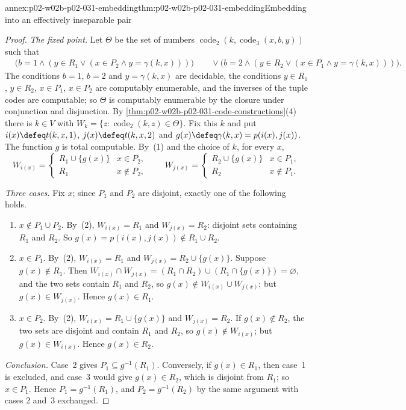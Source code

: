\begin{annexitem}{annex:p02-w02b-p02-031-embedding}{thm:p02-w02b-p02-031-embedding}{Embedding into an effectively inseparable pair}
\begin{proof}
\emph{The fixed point.}  Let \(\Theta\) be the set of numbers
\(\operatorname{code}_2(k,\operatorname{code}_3(x,b,y))\) such that
\[
\begin{aligned}
 &\bigl(b=1\land(y\in R_1\lor(x\in P_2\land y=\gamma(k,x)))\bigr)\
 &\quad\lor
 \bigl(b=2\land(y\in R_2\lor(x\in P_1\land y=\gamma(k,x)))\bigr).
\end{aligned}
\]
The conditions \(b=1\), \(b=2\) and \(y=\gamma(k,x)\) are decidable, the
conditions \(y\in R_1\), \(y\in R_2\), \(x\in P_1\), \(x\in P_2\) are
computably enumerable, and the inverses of the tuple codes are computable; so
\(\Theta\) is computably enumerable by the closure under conjunction and
disjunction.  By \cref{thm:p02-w02b-p02-031-code-constructions}(4) there is
\(k\in V\) with \(W_k=\{z:\operatorname{code}_2(k,z)\in\Theta\}\).  Fix this
\(k\) and put \(i(x)\defeq t(k,x,1)\), \(j(x)\defeq t(k,x,2)\) and
\(g(x)\defeq\gamma(k,x)=p(i(x),j(x))\).  The function \(g\) is total
computable.  By~(1) and the choice of \(k\), for every \(x\),
\[
 W_{i(x)}=\begin{cases}R_1\cup\{g(x)\}&x\in P_2,\\ R_1&x\notin P_2,\end{cases}
 \qquad
 W_{j(x)}=\begin{cases}R_2\cup\{g(x)\}&x\in P_1,\\ R_2&x\notin P_1.\end{cases}
 \tag{2}
\]

\emph{Three cases.}  Fix \(x\); since \(P_1\) and \(P_2\) are disjoint,
exactly one of the following holds.
\begin{enumerate}
\item \(x\notin P_1\cup P_2\).  By~(2), \(W_{i(x)}=R_1\) and
  \(W_{j(x)}=R_2\): disjoint sets containing \(R_1\) and \(R_2\).  So
  \(g(x)=p(i(x),j(x))\notin R_1\cup R_2\).
\item \(x\in P_1\).  By~(2), \(W_{i(x)}=R_1\) and
  \(W_{j(x)}=R_2\cup\{g(x)\}\).  Suppose \(g(x)\notin R_1\).  Then
  \(W_{i(x)}\cap W_{j(x)}=(R_1\cap R_2)\cup(R_1\cap\{g(x)\})=\varnothing\),
  and the two sets contain \(R_1\) and \(R_2\), so
  \(g(x)\notin W_{i(x)}\cup W_{j(x)}\); but \(g(x)\in W_{j(x)}\).  Hence
  \(g(x)\in R_1\).
\item \(x\in P_2\).  By~(2), \(W_{i(x)}=R_1\cup\{g(x)\}\) and
  \(W_{j(x)}=R_2\).  If \(g(x)\notin R_2\), the two sets are disjoint and
  contain \(R_1\) and \(R_2\), so \(g(x)\notin W_{i(x)}\); but \(g(x)\in
  W_{i(x)}\).  Hence \(g(x)\in R_2\).
\end{enumerate}

\emph{Conclusion.}  Case~2 gives \(P_1\subseteq g^{-1}(R_1)\).  Conversely, if
\(g(x)\in R_1\), then case~1 is excluded, and case~3 would give \(g(x)\in R_2\),
which is disjoint from \(R_1\); so \(x\in P_1\).  Hence \(P_1=g^{-1}(R_1)\),
and \(P_2=g^{-1}(R_2)\) by the same argument with cases 2 and~3 exchanged.
\end{proof}
\end{annexitem}

